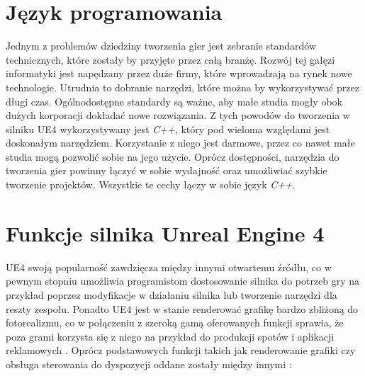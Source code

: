 \documentclass[multip]{SGGW-thesis}
\begin{document}
\section{Język programowania}
Jednym z problemów dziedziny tworzenia gier jest zebranie standardów technicznych,  które zostały by przyjęte przez całą branżę. Rozwój tej gałęzi informatyki jest napędzany przez duże firmy, które wprowadzają na rynek nowe technologie. Utrudnia to dobranie narzędzi, które można by wykorzystywać przez długi czas\cite{perelki}. Ogólnodostępne standardy są ważne, aby małe studia mogły obok dużych korporacji dokładać nowe rozwiązania. Z tych powodów do tworzenia w silniku UE4 wykorzystywany jest {\em C++}, który pod wieloma względami jest doskonałym narzędziem. Korzystanie z niego jest darmowe, przez co nawet małe studia mogą pozwolić sobie na jego użycie. Oprócz dostępności, narzędzia do tworzenia gier powinny łączyć w sobie wydajność oraz umożliwiać szybkie tworzenie projektów. Wszystkie te cechy łączy w sobie język {\em C++}\cite{szkolacpp}.


\section{Funkcje silnika Unreal Engine 4}
UE4 swoją popularność zawdzięcza między innymi otwartemu źródłu, co w pewnym stopniu umożliwia programistom dostosowanie silnika do potrzeb gry na przykład poprzez modyfikacje w działaniu silnika lub tworzenie narzędzi dla reszty zespołu. Ponadto UE4 jest w stanie renderować grafikę bardzo zbliżoną do fotorealizmu, co w połączeniu z szeroką gamą oferowanych funkcji sprawia, że poza grami korzysta się z niego na przykład do produkcji spotów i aplikacji reklamowych \cite{the-human-race}\cite{ikea-vr}.
\newline \indent Oprócz podstawowych funkcji takich jak renderowanie grafiki czy obsługa sterowania do dyspozycji oddane zostały między innymi \cite{docs-ue4-features}:
\end{document}
